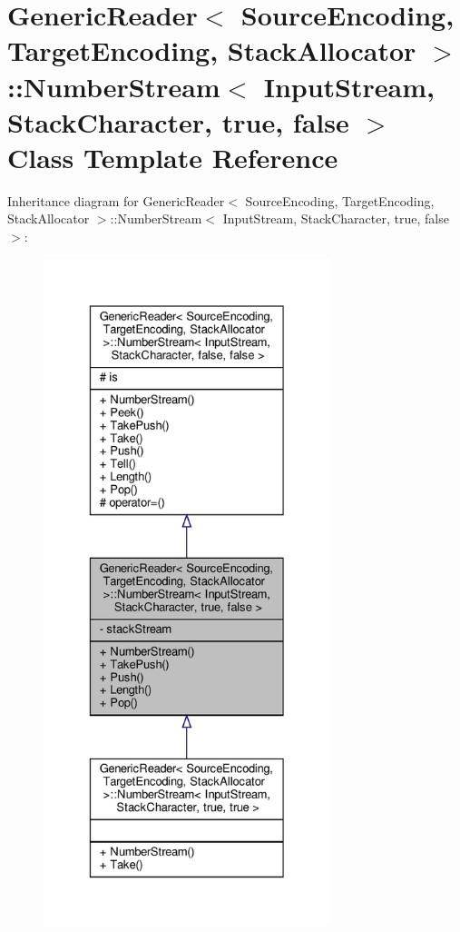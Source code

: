 \hypertarget{classGenericReader_1_1NumberStream_3_01InputStream_00_01StackCharacter_00_01true_00_01false_01_4}{}\section{Generic\+Reader$<$ Source\+Encoding, Target\+Encoding, Stack\+Allocator $>$\+:\+:Number\+Stream$<$ Input\+Stream, Stack\+Character, true, false $>$ Class Template Reference}
\label{classGenericReader_1_1NumberStream_3_01InputStream_00_01StackCharacter_00_01true_00_01false_01_4}


Inheritance diagram for Generic\+Reader$<$ Source\+Encoding, Target\+Encoding, Stack\+Allocator $>$\+:\+:Number\+Stream$<$ Input\+Stream, Stack\+Character, true, false $>$\+:
\nopagebreak
\begin{figure}[H]
\begin{center}
\leavevmode
\includegraphics[height=550pt]{classGenericReader_1_1NumberStream_3_01InputStream_00_01StackCharacter_00_01true_00_01false_01_4__inherit__graph}
\end{center}
\end{figure}


